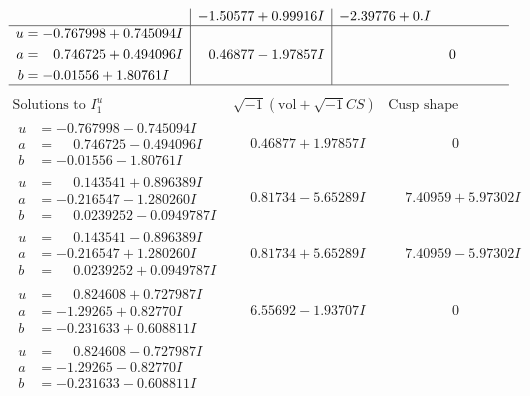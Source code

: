 \documentclass[1p]{elsarticle_modified}
\theoremstyle{definition}
\newcommand{\I}{\sqrt{-1}}
\begin{document}
$$\begin{array}{c|c|c}
 & -1.50577 + 0.99916 I & -2.39776 + 0. I\phantom{ +0.000000I} \\ \hline\begin{aligned}
u &= -0.767998 + 0.745094 I \\
a &= \phantom{-}0.746725 + 0.494096 I \\
b &= -0.01556 + 1.80761 I\end{aligned}
 & \phantom{-}0.46877 - 1.97857 I & \phantom{-0.000000 } 0\\
 \hline 
 \end{array}$$\newpage$$\begin{array}{c|c|c}  
\text{Solutions to }I^u_{1}& \I (\text{vol} + \sqrt{-1}CS) & \text{Cusp shape}\\
 \hline 
\begin{aligned}
u &= -0.767998 - 0.745094 I \\
a &= \phantom{-}0.746725 - 0.494096 I \\
b &= -0.01556 - 1.80761 I\end{aligned}
 & \phantom{-}0.46877 + 1.97857 I & \phantom{-0.000000 } 0 \\ \hline\begin{aligned}
u &= \phantom{-}0.143541 + 0.896389 I \\
a &= -0.216547 - 1.280260 I \\
b &= \phantom{-}0.0239252 - 0.0949787 I\end{aligned}
 & \phantom{-}0.81734 - 5.65289 I & \phantom{-}7.40959 + 5.97302 I \\ \hline\begin{aligned}
u &= \phantom{-}0.143541 - 0.896389 I \\
a &= -0.216547 + 1.280260 I \\
b &= \phantom{-}0.0239252 + 0.0949787 I\end{aligned}
 & \phantom{-}0.81734 + 5.65289 I & \phantom{-}7.40959 - 5.97302 I \\ \hline\begin{aligned}
u &= \phantom{-}0.824608 + 0.727987 I \\
a &= -1.29265 + 0.82770 I \\
b &= -0.231633 + 0.608811 I\end{aligned}
 & \phantom{-}6.55692 - 1.93707 I & \phantom{-0.000000 } 0 \\ \hline\begin{aligned}
u &= \phantom{-}0.824608 - 0.727987 I \\
a &= -1.29265 - 0.82770 I \\
b &= -0.231633 - 0.608811 I\end{aligned}

\end{array}$$
\end{document}
